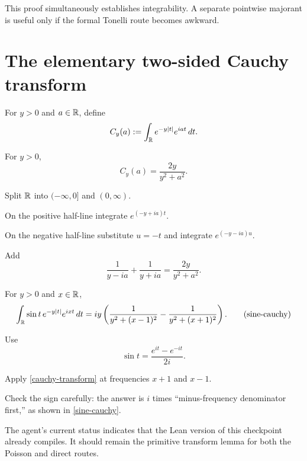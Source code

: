 This proof simultaneously establishes integrability. A separate pointwise majorant is useful only if the formal Tonelli route becomes awkward.

\section{The elementary two-sided Cauchy transform}

For $y>0$ and $a\in\mathbb{R}$, define
\[
  C_y(a):=\int_{\mathbb{R}} e^{-y\left\lvert t\right\rvert}e^{iat}\,dt.
\]

\begin{lemma}
For $y>0$,
\begin{equation}
  C_y(a)=\frac{2y}{y^2+a^2}.
  \tag{cauchy-transform}\label{cauchy-transform}
\end{equation}
\end{lemma}

\begin{proofoutline}
\item Split $\mathbb{R}$ into $(-\infty,0]$ and $(0,\infty)$.
\item On the positive half-line integrate $e^{(-y+ia)t}$.
\item On the negative half-line substitute $u=-t$ and integrate $e^{(-y-ia)u}$.
\item Add
\[
  \frac1{y-ia}+\frac1{y+ia}=\frac{2y}{y^2+a^2}.
\]
\end{proofoutline}

\begin{corollary}
For $y>0$ and $x\in\mathbb{R}$,
\begin{equation}
\int_{\mathbb{R}}\sin t\,e^{-y\left\lvert t\right\rvert}e^{ixt}\,dt
=i y\left(
  \frac1{y^2+(x-1)^2}
  -\frac1{y^2+(x+1)^2}
\right).
\tag{sine-cauchy}\label{sine-cauchy}
\end{equation}
\end{corollary}

\begin{proofoutline}
\item Use
\[
  \sin t=\frac{e^{it}-e^{-it}}{2i}.
\]
\item Apply \eqref{cauchy-transform} at frequencies $x+1$ and $x-1$.
\item Check the sign carefully: the answer is $i$ times ``minus-frequency denominator first,'' as shown in \eqref{sine-cauchy}.
\end{proofoutline}

The agent's current status indicates that the Lean version of this checkpoint already compiles. It should remain the primitive transform lemma for both the Poisson and direct routes.

